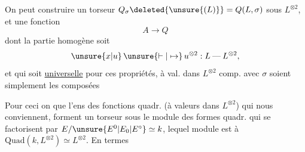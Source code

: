 On peut construire un torseur
$Q_{\sigma}\deleted{\unsure{(L)}}=Q(L,\sigma)$ sous $L^{\otimes 2}$, et une fonction
\[
A\longrightarrow Q
\]
dont la partie homogène soit
\[
\unsure{x|u}\,\unsure{\vdash|\mapsto}\,u^{\otimes 2}:L\mathbin{\text{---}}L^{\otimes 2},
\]
et qui soit \uline{universelle} pour ces
propriétés, 
 à val. dans $L^{\otimes 2}$ comp. avec
$\sigma$ soient simplement les composées

Pour ceci on  que l'ens des
fonctions  quadr. (à valeurs dans $L^{\otimes 2}$)
qui nous conviennent, forment un
torseur sous le module des formes
quadr. qui se factorisent par
$E/\unsure{E^0|E_0|E^\circ}\simeq k$, lequel module est 
à $\mathrm{Quad}(k,L^{\otimes 2})\simeq L^{\otimes 2}$. En termes
